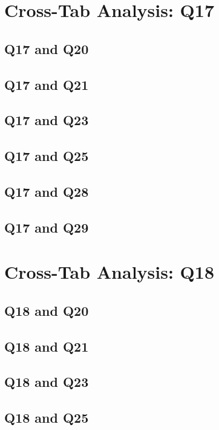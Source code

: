 \documentclass{report}
\begin{document}
\chapter{Cross-Tab Analysis: Q17}

\section{Q17 and Q20}\clearpage
\section{Q17 and Q21}\clearpage
\section{Q17 and Q23}\clearpage
\section{Q17 and Q25}\clearpage
\section{Q17 and Q28}\clearpage
\section{Q17 and Q29}\clearpage

\chapter{Cross-Tab Analysis: Q18}

\section{Q18 and Q20}\clearpage
\section{Q18 and Q21}\clearpage
\section{Q18 and Q23}\clearpage
\section{Q18 and Q25}\clearpage
\end{document}

